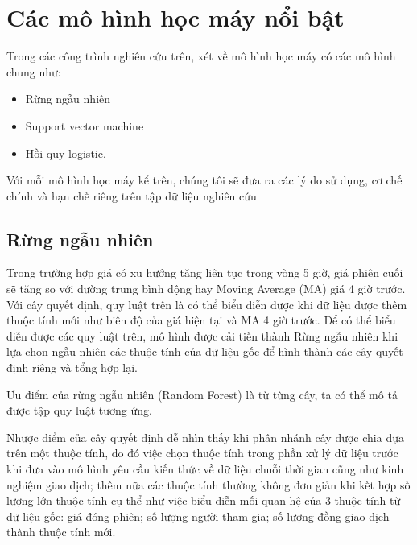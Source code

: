 \section{Các mô hình học máy nổi bật}

Trong các công trình nghiên cứu trên, xét về mô hình học máy có các mô hình chung như:
\begin{itemize}
    \item Rừng ngẫu nhiên
    \item Support vector machine
    \item Hồi quy logistic.
\end{itemize}
Với mỗi mô hình học máy kể trên, chúng tôi sẽ đưa ra các lý do sử dụng, cơ chế chính và hạn chế riêng trên tập dữ liệu nghiên cứu
\subsection{Rừng ngẫu nhiên}
Trong trường hợp giá có xu hướng tăng liên tục trong vòng 5 giờ, giá phiên cuối sẽ tăng so với đường trung bình động hay Moving Average (MA) giá 4 giờ trước. Với cây quyết định, quy luật trên là có thể biểu diễn được khi dữ liệu được thêm thuộc tính mới như biên độ của giá hiện tại và MA 4 giờ trước. Để  có thể biểu diễn được các quy luật trên, mô hình được cải tiến thành Rừng ngẫu nhiên khi lựa chọn ngẫu nhiên các thuộc tính của dữ liệu gốc để hình thành các cây quyết định riêng và tổng hợp lại.

Ưu điểm của rừng ngẫu nhiên (Random Forest) là từ từng cây, ta có thể mô tả được tập quy luật tương ứng.

Nhược điểm của cây quyết định dễ nhìn thấy khi phân nhánh cây được chia dựa trên một thuộc tính, do đó việc chọn thuộc tính trong phần xử lý dữ liệu trước khi đưa vào mô hình yêu cầu kiến thức về dữ liệu chuỗi thời gian cũng như kinh nghiệm giao dịch; thêm nữa các thuộc tính thường không đơn giản khi kết hợp số lượng lớn thuộc tính cụ thể như việc biểu diễn mối quan hệ của 3 thuộc tính từ dữ liệu gốc: giá đóng phiên; số lượng người tham gia; số lượng đồng giao dịch thành thuộc tính mới.

